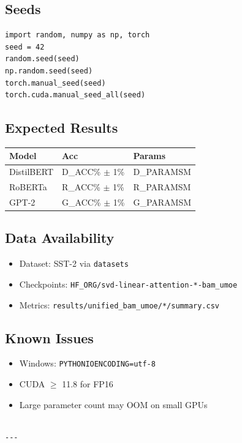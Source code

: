 \subsection{Seeds}

\begin{lstlisting}
import random, numpy as np, torch
seed = 42
random.seed(seed)
np.random.seed(seed)
torch.manual_seed(seed)
torch.cuda.manual_seed_all(seed)
\end{lstlisting}

\subsection{Expected Results}

\begin{table}[H]
\centering
\small
\begin{tabular}{lll}
\toprule
\textbf{Model} & \textbf{Acc} & \textbf{Params} \\
\midrule
DistilBERT & {{D\_ACC}}\% $\pm$ 1\% & {{D\_PARAMS}}M \\
RoBERTa & {{R\_ACC}}\% $\pm$ 1\% & {{R\_PARAMS}}M \\
GPT-2 & {{G\_ACC}}\% $\pm$ 1\% & {{G\_PARAMS}}M \\
\bottomrule
\end{tabular}
\end{table}

\subsection{Data Availability}

\begin{itemize}
\item Dataset: SST-2 via \texttt{datasets}
\item Checkpoints: \texttt{{{HF\_ORG}}/svd-linear-attention-*-bam\_umoe}
\item Metrics: \texttt{results/unified\_bam\_umoe/*/summary.csv}

\end{itemize}
\subsection{Known Issues}

\begin{itemize}
\item Windows: \texttt{PYTHONIOENCODING=utf-8}
\item CUDA $\ge$ 11.8 for FP16
\item Large parameter count may OOM on small GPUs
\end{itemize}
\begin{lstlisting}

---
\end{lstlisting}